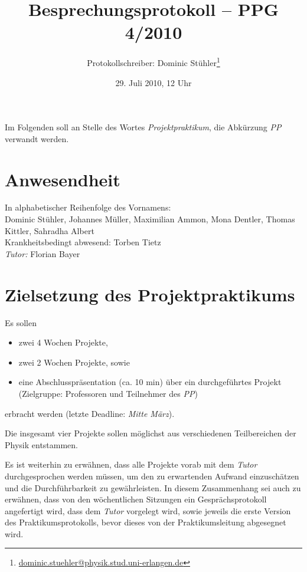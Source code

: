 \documentclass[%
fontsize=12pt,
paper=a4,
DIV=calc,
]{scrartcl}
\begin{document}
\title{Besprechungsprotokoll -- PPG 4/2010}
\author{Protokollschreiber: Dominic Stühler\thanks{\url{dominic.stuehler@physik.stud.uni-erlangen.de}}}
\date{29. Juli 2010, 12 Uhr}
\maketitle

Im Folgenden soll an Stelle des Wortes \emph{Projektpraktikum}, die Abkürzung \emph{PP} verwandt werden.

\tableofcontents

\section{Anwesendheit}
In alphabetischer Reihenfolge des Vornamens:\\[0.5\baselineskip]
Dominic Stühler, Johannes Müller, Maximilian Ammon, Mona Dentler, Thomas Kittler, Sahradha Albert\\
Krankheitsbedingt abwesend: Torben Tietz\\
\emph{Tutor:} Florian Bayer

\section{Zielsetzung des Projektpraktikums}
Es sollen 
\begin{itemize}
	\item zwei 4 Wochen Projekte,
	\item zwei 2 Wochen Projekte, sowie
	\item eine Abschlusspräsentation (ca. 10 min) über ein durchgeführtes Projekt (Zielgruppe: Professoren und Teilnehmer des \emph{PP})
\end{itemize}
erbracht werden (letzte Deadline: \textit{Mitte März}).\par
Die insgesamt vier Projekte sollen möglichst aus verschiedenen Teilbereichen der Physik entstammen.\par
Es ist weiterhin zu erwähnen, dass alle Projekte vorab mit dem \emph{Tutor} durchgesprochen werden müssen, um den zu erwartenden Aufwand einzuschätzen und die Durchführbarkeit zu gewährleisten. In diesem Zusammenhang sei auch zu erwähnen, dass von den wöchentlichen Sitzungen ein Gesprächsprotokoll angefertigt wird, dass dem \emph{Tutor} vorgelegt wird, sowie jeweils die erste Version des Praktikumsprotokolls, bevor dieses von der Praktikumsleitung abgesegnet wird.\par 
\end{document}
